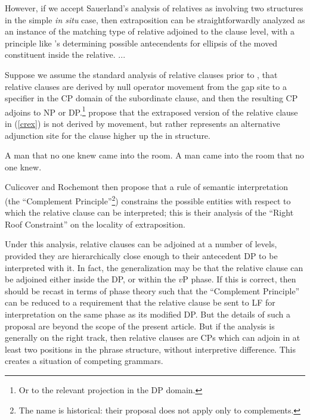 \begin{exe}
         
\end{exe}

However, if we accept Sauerland's analysis of relatives as involving two structures in the simple \textsl{in situ} case, then extraposition can be straightforwardly analyzed as an instance of the matching type of relative adjoined to the clause level, with a principle like \citet{culicoverrochemont1990}'s determining possible antecendents for ellipsis of the moved constituent inside the relative. ...

Suppose we assume the standard analysis of relative clauses prior to \citet{kayne1994}, that relative clauses are derived by null operator movement from the gap site to a specifier in the CP domain of the subordinate clause, and then the resulting CP adjoins to NP or DP.\footnote{Or to the relevant projection in the DP domain.} \citet{culicoverrochemont1990} propose that the extraposed version of the relative clause in (\ref{crex}) is not derived by movement, but rather represents an alternative adjunction site for the clause higher up the in structure.

\begin{exe}
    \ex \begin{xlist}
         \ex \label{crinsitu} A man that no one knew came into the room.
         \ex \label{crex} A man came into the room that no one knew.
         \end{xlist}
         \citep[][23]{culicoverrochemont1990}
\end{exe}

\noindent Culicover and Rochemont then propose that a rule of semantic interpretation (the ``Complement Principle''\footnote{The name is historical: their proposal does not apply only to complements.}) constrains the possible entities with respect to which the relative clause can be interpreted; this is their analysis of the ``Right Roof Constraint'' on the locality of extraposition.

Under this analysis, relative clauses can be adjoined at a number of levels, provided they are hierarchically close enough to their antecedent DP to be interpreted with it. In fact, the generalization may be that the relative clause can be adjoined either inside the DP, or within the $v$P phase. If this is correct, then \citet{culicoverrochemont1990} should be recast in terms of phase theory such that the ``Complement Principle'' can be reduced to a requirement that the relative clause be sent to LF for interpretation on the same phase as its modified DP. But the details of such a proposal are beyond the scope of the present article. But if the analysis is generally on the right track, then relative clauses are CPs which can adjoin in at least two positions in the phrase structure, without interpretive difference. This creates a situation of competing grammars.

